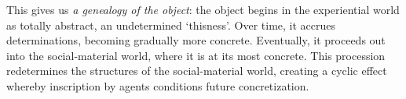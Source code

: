 This gives us \textit{a genealogy of the object}: the object begins in the experiential world as totally abstract, an undetermined `thisness'. Over time, it accrues determinations, becoming gradually more concrete. Eventually, it proceeds out into the social-material world, where it is at its most concrete. This procession redetermines the structures of the social-material world, creating a cyclic effect whereby inscription by agents conditions future concretization.




